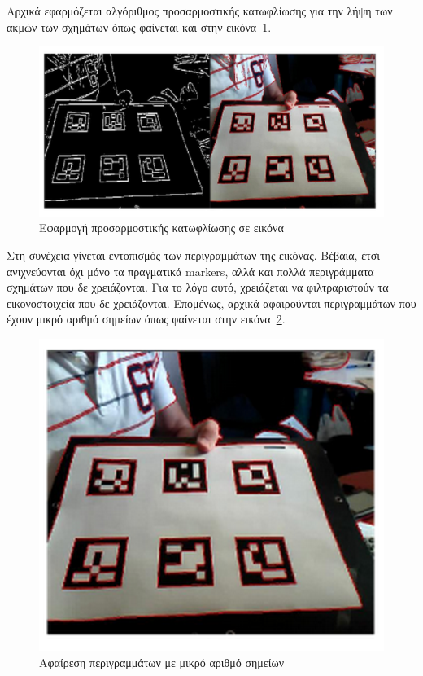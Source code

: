 Αρχικά εφαρμόζεται αλγόριθμος προσαρμοστικής κατωφλίωσης για την λήψη των ακμών των σχημάτων όπως φαίνεται και στην εικόνα~\ref{fig:aruco1}.

\begin{figure}[H]
    \centering
    \includegraphics[scale=0.6, angle=0]{Files/Figures/aruco1.png}
    \caption[Εφαρμογή προσαρμοστικής κατωφλίωσης σε εικόνα]{Εφαρμογή προσαρμοστικής κατωφλίωσης σε εικόνα}
    \label{fig:aruco1}
\end{figure}


Στη συνέχεια γίνεται εντοπισμός των περιγραμμάτων της εικόνας. Βέβαια, έτσι ανιχνεύονται όχι μόνο τα πραγματικά markers, αλλά και πολλά περιγράμματα σχημάτων που δε χρειάζονται. Για το λόγο αυτό, χρειάζεται να φιλτραριστούν τα εικονοστοιχεία που δε χρειάζονται. Επομένως, αρχικά αφαιρούνται περιγραμμάτων που έχουν μικρό αριθμό σημείων όπως φαίνεται στην εικόνα~\ref{fig:aruco2}.


\begin{figure}[H]
    \centering
    \includegraphics[scale=0.58, angle=0]{Files/Figures/aruco2.png}
    \caption[Αφαίρεση περιγραμμάτων με μικρό αριθμό σημείων]{Αφαίρεση περιγραμμάτων με μικρό αριθμό σημείων}
    \label{fig:aruco2}
\end{figure}



